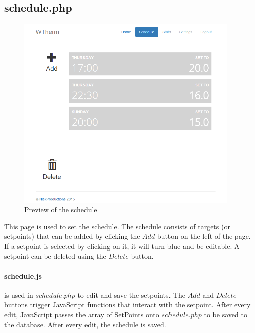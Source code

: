 \documentclass[12pt,a4paper,final]{report}
\begin{document}
\subsection*{schedule.php}
\begin{figure}[H]
  \begin{center}
      \includegraphics[width=0.95\textwidth]{ui/schedule}
  \end{center}
  \caption{Preview of the schedule}
\end{figure}
This page is used to set the schedule. The schedule consists of targets (or setpoints) that can be added by clicking the $Add$ button on the left of the page. If a setpoint is selected by clicking on it, it will turn blue and be editable. A setpoint can be deleted using the $Delete$ button.

\paragraph{schedule.js} is used in $schedule.php$ to edit and save the setpoints. The $Add$ and $Delete$ buttons trigger JavaScript functions that interact with the setpoint. After every edit, JavaScript passes the array of SetPoints onto $schedule.php$ to be saved to the database. After every edit, the schedule is saved.
\end{document}
